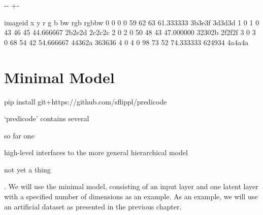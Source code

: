 \documentclass[letterpaper,10pt,english]{sphinxmanual}
\newlength\nbsphinxcodecellspacing
\begin{document}
{

\kern-\sphinxverbatimsmallskipamount\kern-\baselineskip
\kern+\FrameHeightAdjust\kern-\fboxrule
\vspace{\nbsphinxcodecellspacing}

\begin{sphinxVerbatim}[commandchars=\\\{\}]
\llap{\color{nbsphinxout}[4]:\,\hspace{\fboxrule}\hspace{\fboxsep}}   image\PYGZus{}id  x  y   r   g   b         bw      rgb   rgb\PYGZus{}bw
0         0  0  0  59  62  63  61.333333  \PYGZsh{}3b3e3f  \PYGZsh{}3d3d3d
1         0  1  0  43  46  45  44.666667  \PYGZsh{}2b2e2d  \PYGZsh{}2c2c2c
2         0  2  0  50  48  43  47.000000  \PYGZsh{}32302b  \PYGZsh{}2f2f2f
3         0  3  0  68  54  42  54.666667  \PYGZsh{}44362a  \PYGZsh{}363636
4         0  4  0  98  73  52  74.333333  \PYGZsh{}624934  \PYGZsh{}4a4a4a
\end{sphinxVerbatim}
}


\chapter{Minimal Model}
\label{\detokenize{usage/minimal_model:Minimal-Model}}\label{\detokenize{usage/minimal_model::doc}}

{
\begin{sphinxVerbatim}[commandchars=\\\{\}]
\llap{\color{nbsphinxin}[10]:\,\hspace{\fboxrule}\hspace{\fboxsep}}
       
    pip install git+https://github.com/sflippl/predicode
       
\end{sphinxVerbatim}
}

‘predicode’ contains several %
\begin{footnote}[1]\sphinxAtStartFootnote
so far one
%
\end{footnote} high-level interfaces to the more general hierarchical model %
\begin{footnote}[2]\sphinxAtStartFootnote
not yet a thing
%
\end{footnote}. We will use the minimal model, consisting of an input layer and one latent layer with a specified number of dimensions as an example. As an example, we will use an artificial dataset as presented in the previous chapter.
\end{document}
